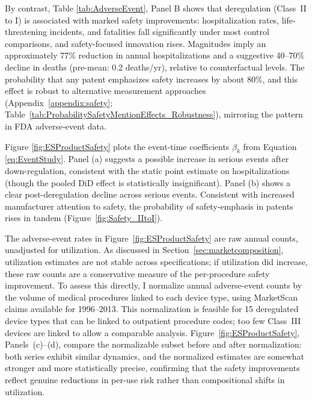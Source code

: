 \documentclass[letterpaper,12pt]{article}
\theoremstyle{definition}
\begin{document}
By contrast, Table \ref{tab:AdverseEvent}, Panel B shows that deregulation (Class~II to I) is associated with marked safety improvements: hospitalization rates, life-threatening incidents, and fatalities fall significantly under most control comparisons, and safety-focused innovation rises. Magnitudes imply an approximately 77\% reduction in annual hospitalizations and a suggestive 40--70\% decline in deaths (pre-mean: 0.2 deaths/yr), relative to counterfactual levels. The probability that any patent emphasizes safety increases by about 80\%, and this effect is robust to alternative measurement approaches (Appendix~\ref{appendix:safety}; Table~\ref{tab:ProbabilitySafetyMentionEffects_Robustness}), mirroring the pattern in FDA adverse‐event data.\footnotemark {}


Figure \ref{fig:ESProductSafety} plots the event-time coefficients $\beta_k$ from Equation \ref{eq:EventStudy}.\footnotemark {} Panel (a) suggests a possible increase in serious events after down-regulation, consistent with the static point estimate on hospitalizations (though the pooled DiD effect is statistically insignificant). Panel (b) shows a clear post-deregulation decline across serious events. Consistent with increased manufacturer attention to safety, the probability of safety‐emphasis in patents rises in tandem (Figure~\ref{fig:Safety_IItoI}).

The adverse-event rates in Figure~\ref{fig:ESProductSafety} are raw annual counts, unadjusted for utilization. As discussed in Section~\ref{sec:marketcomposition}, utilization estimates are not stable across specifications; if utilization did increase, these raw counts are a conservative measure of the per-procedure safety improvement. To assess this directly, I normalize annual adverse-event counts by the volume of medical procedures linked to each device type, using MarketScan claims available for 1996--2013. This normalization is feasible for 15 deregulated device types that can be linked to outpatient procedure codes; too few Class~III devices are linked to allow a comparable analysis. Figure~\ref{fig:ESProductSafety}, Panels~(c)--(d), compare the normalizable subset before and after normalization: both series exhibit similar dynamics, and the normalized estimates are somewhat stronger and more statistically precise, confirming that the safety improvements reflect genuine reductions in per-use risk rather than compositional shifts in utilization.
\end{document}
